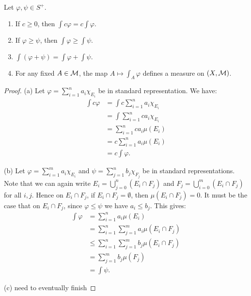 \begin{proposition}
    Let $\varphi, \psi \in S^+$.
    \begin{enumerate}[label = (\arabic*),itemsep=1pt,topsep=3pt]
        \item If $c \geq 0$, then $\int c \varphi = c \int \varphi$.
        \item If $\varphi \geq \psi$, then $\int \varphi \geq \int \psi$.
        \item $\int (\varphi + \psi) = \int \varphi + \int \psi$.
        \item For any fixed $A \in \mathcal{M}$, the map $A \mapsto \int_A \varphi$ defines a measure on $(X,\mathcal{M})$.
    \end{enumerate}
\end{proposition}
    \begin{proof}
        (a) Let $\varphi = \sum_{i = 1}^n a_i \chi_{E_i}$ be in standard representation. We have:
            \begin{equation*}
            \begin{split}
                \int c \varphi 
                & = \int c \sum_{i = 1}^n a_i \chi_{E_i} \\
                & = \int \sum_{i = 1}^n c a_i \chi_{E_i} \\
                & = \sum_{i = 1}^n c a_i \mu(E_i) \\
                & = c \sum_{i = 1}^n a_i \mu(E_i) \\
                & = c \int \varphi.
            \end{split}
            \end{equation*}

        (b) Let $\varphi = \sum_{i = 1}^m a_i \chi_{E_i}$ and $\psi = \sum_{j = 1}^n b_j \chi_{F_j}$ be in standard representations. Note that we can again write $E_i = \bigcup_{j = 0}^n (E_i \cap F_j)$ and $F_j = \bigcup_{i = 0}^m (E_i \cap F_j)$ for all $i,j$. Hence on $E_i \cap F_j$, if $E_i \cap F_j = \emptyset$, then $\mu(E_i \cap F_j) = 0$. It must be the case that on $E_i \cap F_j$, since $\varphi \leq \psi$ we have $a_i \leq b_j$. This gives:
            \begin{equation*}
            \begin{split}
                \int \varphi 
                & = \sum_{i=1}^n a_i \mu(E_i) \\
                & = \sum_{i = 1}^n \sum_{j = 1}^m a_i \mu(E_i \cap F_j) \\
                & \leq \sum_{i = 1}^n \sum_{j = 1}^m b_j \mu(E_i \cap F_j) \\
                & = \sum_{j = 1}^m b_j \mu(F_j) \\
                & = \int \psi.
            \end{split}
            \end{equation*}

        (c) {\color{red} need to eventually finish}
    \end{proof}

